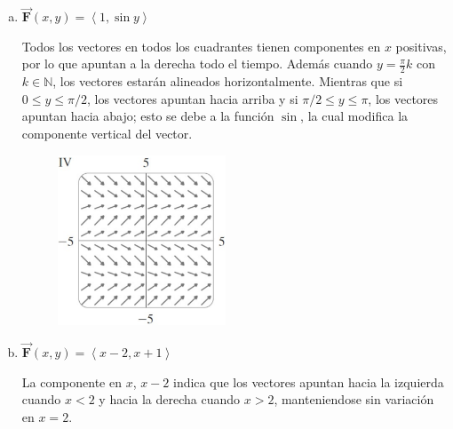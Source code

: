 \documentclass[12pt]{exam}
\newcommand{\vecb}[1]{\pmb{\vec{#1}}} %
\newcommand{\pvec}[1]{\left\langle #1 \right\rangle} %
\begin{document}
\begin{questions}
\begin{enumerate}[a)]
  \item $\vecb{F}(x,y)=\pvec{1,\sin{y}}$

    \begin{minipage}{0.5\textwidth}
      Todos los vectores en todos los cuadrantes tienen componentes en $x$ positivas, por lo que apuntan a la derecha todo el tiempo.
      Además cuando $y=\frac{\pi}{2}k$ con $k \in \mathbb{N}$, los vectores estarán alineados horizontalmente. Mientras que si $0 \leq y \leq \pi/2$, los vectores apuntan hacia arriba 
      y si $\pi/2 \leq y \leq \pi$, los vectores apuntan hacia abajo; esto se debe a la función $\sin{}$, la cual modifica la componente vertical del vector. \\
    \end{minipage}%
    \begin{minipage}{0.5\textwidth}
      \begin{figure}[H]
        \centering
        \centering
        \includegraphics[width=5cm]{./img/ej1_IV.png}
      \end{figure}
    \end{minipage}

    
  \item $\vecb{F}(x,y)=\pvec{x-2,x+1}$

    \begin{minipage}{0.5\textwidth}
      La componente en $x$, $x-2$ indica que los vectores apuntan hacia la izquierda cuando $x<2$ y hacia la derecha cuando $x>2$, manteniendose sin variación en $x=2$.


\end{minipage}
\end{enumerate}
\end{questions}
\end{document}
